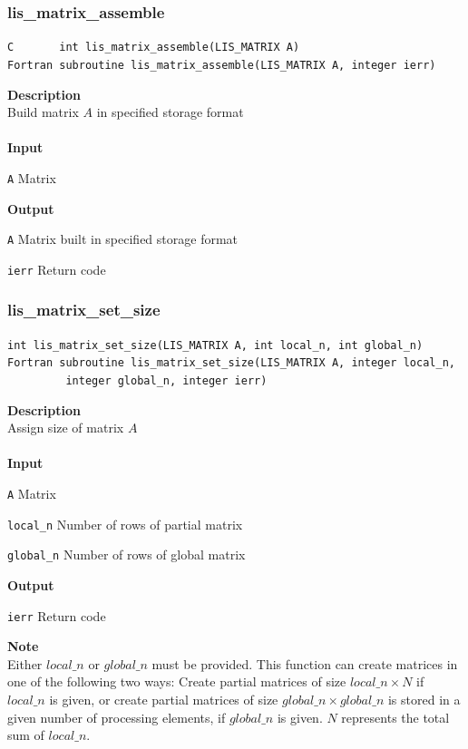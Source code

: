 \documentclass[a4paper]{article}
\newcommand{\namelistlabel}[1]{\mbox{#1}\hfill}
\newenvironment{namelist}[1]{%
 \begin{list}{}
  {\let\makelabel\namelistlabel
  \settowidth{\labelwidth}{#1}
  \setlength{\leftmargin}{1.1\labelwidth}}
}{%
\end{list}}
\begin{document}
  \subsubsection{lis\_matrix\_assemble}
\begin{screen}
\verb|C       int lis_matrix_assemble(LIS_MATRIX A)|\\
\verb|Fortran subroutine lis_matrix_assemble(LIS_MATRIX A, integer ierr)|
\end{screen}
{\bf Description}\\
\indent
Build matrix $A$ in specified storage format
\\ \\
\noindent
{\bf Input}
\begin{namelist}{XXXXXXXXXXXXXXXXXXXX}
\item[\tt A] Matrix
\end{namelist}
{\bf Output}
\begin{namelist}{XXXXXXXXXXXXXXXXXXXX}
\item[\tt A] Matrix built in specified storage format
\item[\tt ierr] Return code
\end{namelist}
  \subsubsection{lis\_matrix\_set\_size}
\begin{screen}
\verb|int lis_matrix_set_size(LIS_MATRIX A, int local_n, int global_n)|
\verb|Fortran subroutine lis_matrix_set_size(LIS_MATRIX A, integer local_n,|\\
\verb|         integer global_n, integer ierr)|
\end{screen}
{\bf Description}\\
\indent
Assign size of matrix $A$ 
\\ \\
\noindent
{\bf Input}
\begin{namelist}{XXXXXXXXXXXXXXXXXXXX}
\item[\tt A] Matrix
\item[\tt local\_n] Number of rows of partial matrix
\item[\tt global\_n] Number of rows of global matrix
\end{namelist}
{\bf Output}
\begin{namelist}{XXXXXXXXXXXXXXXXXXXX}
\item[\tt ierr] Return code
\end{namelist}
{\bf Note}\\
\indent
Either $local\_n$ or $global\_n$ must be provided. 
This function can create matrices in one of the following two ways: 
Create partial matrices of size $local\_n \times N$ if $local\_n$ is given, or 
create partial matrices of size $global\_n \times global\_n$ is stored 
in a given number of processing elements, if $global\_n$ is given. 
$N$ represents the total sum of $local\_n$. 
\end{document}
